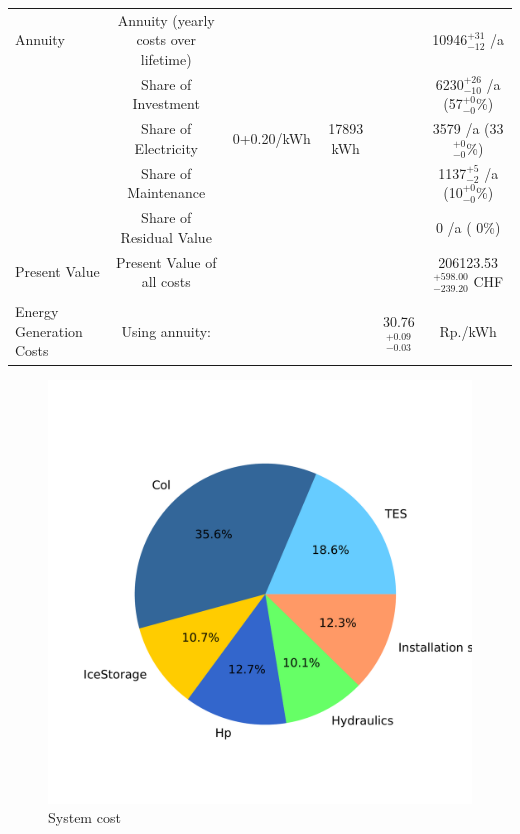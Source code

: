 \documentclass[english]{SPFShortReport}
\begin{document}
\begin{table}[!ht]
\begin{adjustbox}{max width =\textwidth}
\begin{tabular}{l | c c c c c }
Annuity & Annuity (yearly costs over lifetime)  &&& & 10946$^{\mathrm{+31}}_{\mathrm{-12}}$ /a  \\
 & Share of Investment & &&& 6230$^{\mathrm{+26}}_{\mathrm{-10}}$ /a (57$^{\mathrm{+ 0}}_{\mathrm{- 0}}$\%) \\
 & Share of Electricity & 0+0.20/kWh & 17893 kWh &  & 3579 /a (33$^{\mathrm{+ 0}}_{\mathrm{- 0}}$\%)\\
 & Share of Maintenance & &&& 1137$^{\mathrm{+ 5}}_{\mathrm{- 2}}$ /a (10$^{\mathrm{+ 0}}_{\mathrm{- 0}}$\%)\\ 
 & Share of Residual Value &&& &  0 /a ( 0\%)\\
Present Value  & Present Value of all costs  & &&& 206123.53$^{\mathrm{+598.00}}_{\mathrm{-239.20}}$ CHF \\
\hline \\ 
 Energy Generation Costs & Using annuity: &&& 30.76$^{\mathrm{+0.09}}_{\mathrm{-0.03}}$ & Rp./kWh \\
\hline
\hline
\end{tabular}
\end{adjustbox}
\label{CostsTable}
\end{table}
\begin{figure}[!htbp]
\begin{center}
\includegraphics[width=1\textwidth]{costShare-HydD_mfb30_ideal_dryN-CityBAS_dryNAc1.0x35.659Vice0.4x35.659HP1.0x17.109-Year0.pdf}
\caption{System cost}
\label{systemCost}
\end{center}
\end{figure}
\end{document}
